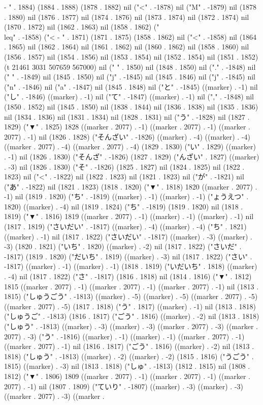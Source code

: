 -
" . 1884) (1884 . 1888) (1878 . 1882) nil ("<" . -1878) nil ("M" . -1879) nil (1878 . 1880) nil (1876 . 1877) nil (1874 . 1876) nil (1873 . 1874) nil (1872 . 1874) nil (1870 . 1872) nil (1862 . 1863) nil (1858 . 1862) ("\\leq" . -1858) ("<
-
" . 1871) (1871 . 1875) (1858 . 1862) nil ("<" . -1858) nil (1864 . 1865) nil (1862 . 1864) nil (1861 . 1862) nil (1860 . 1862) nil (1858 . 1860) nil (1856 . 1857) nil (1854 . 1856) nil (1853 . 1854) nil (1852 . 1854) nil (1851 . 1852) (t 21461 3031 507659 567000) nil (" " . 1850) nil (1848 . 1850) nil ("." . -1848) nil (" " . -1849) nil (1845 . 1850) nil ("j" . -1845) nil (1845 . 1846) nil ("j" . -1845) nil ("n" . -1846) nil ("a" . -1847) nil (1845 . 1848) nil ("と" . -1845) ((marker) . -1) nil ("し" . -1846) ((marker) . -1) nil ("て" . -1847) ((marker) . -1) nil ("," . -1848) nil (1850 . 1852) nil (1845 . 1850) nil (1838 . 1844) nil (1836 . 1838) nil (1835 . 1836) nil (1834 . 1836) nil (1831 . 1834) nil (1828 . 1831) nil ("う" . -1828) nil (1827 . 1829) ("▼" . 1825) 1828 ((marker . 2077) . -1) ((marker . 2077) . -1) ((marker . 2077) . -1) nil (1826 . 1828) ("そんざい" . -1826) ((marker) . -4) ((marker) . -4) ((marker . 2077) . -4) ((marker . 2077) . -4) (1829 . 1830) ("い" . 1829) ((marker) . -1) nil (1826 . 1830) ("そんざ" . -1826) (1827 . 1829) ("んざい" . 1827) ((marker) . -3) nil (1826 . 1830) ("そ" . -1826) (1825 . 1827) nil (1824 . 1825) nil (1822 . 1823) nil ("<" . -1822) nil (1822 . 1823) nil (1821 . 1823) nil ("が" . -1821) nil ("あ" . -1822) nil (1821 . 1823) (1818 . 1820) ("▼" . 1818) 1820 ((marker . 2077) . -1) nil (1819 . 1820) ("ち" . -1819) ((marker) . -1) ((marker) . -1) ("ょうえつ" . 1820) ((marker) . -4) nil (1819 . 1824) ("ち" . -1819) (1819 . 1820) nil (1818 . 1819) ("▼" . 1816) 1819 ((marker . 2077) . -1) ((marker) . -1) ((marker) . -1) nil (1817 . 1819) ("さいだい" . -1817) ((marker) . -4) ((marker) . -4) ("ち" . 1821) ((marker) . -1) nil (1817 . 1822) ("さいだい" . -1817) ((marker) . -3) ((marker) . -3) (1820 . 1821) ("いち" . 1820) ((marker) . -2) nil (1817 . 1822) ("さいだ" . -1817) (1819 . 1820) ("だいち" . 1819) ((marker) . -3) nil (1817 . 1822) ("さい" . -1817) ((marker) . -1) ((marker) . -1) (1818 . 1819) ("いだいち" . 1818) ((marker) . -4) nil (1817 . 1822) ("さ" . -1817) (1816 . 1818) nil (1814 . 1816) ("▼" . 1812) 1815 ((marker . 2077) . -1) ((marker . 2077) . -1) ((marker . 2077) . -1) nil (1813 . 1815) ("しゅうごう" . -1813) ((marker) . -5) ((marker) . -5) ((marker . 2077) . -5) ((marker . 2077) . -5) (1817 . 1818) ("う" . 1817) ((marker) . -1) nil (1813 . 1818) ("しゅうご" . -1813) (1816 . 1817) ("ごう" . 1816) ((marker) . -2) nil (1813 . 1818) ("しゅう" . -1813) ((marker) . -3) ((marker) . -3) ((marker . 2077) . -3) ((marker . 2077) . -3) ("う" . -1816) ((marker) . -1) ((marker) . -1) ((marker . 2077) . -1) ((marker . 2077) . -1) nil (1816 . 1817) ("ごう" . 1816) ((marker) . -2) nil (1813 . 1818) ("しゅう" . -1813) ((marker) . -2) ((marker) . -2) (1815 . 1816) ("うごう" . 1815) ((marker) . -3) nil (1813 . 1818) ("しゅ" . -1813) (1812 . 1815) nil (1808 . 1812) ("▼" . 1806) 1809 ((marker . 2077) . -1) ((marker . 2077) . -1) ((marker . 2077) . -1) nil (1807 . 1809) ("ていり" . -1807) ((marker) . -3) ((marker) . -3) ((marker . 2077) . -3) ((marker . 